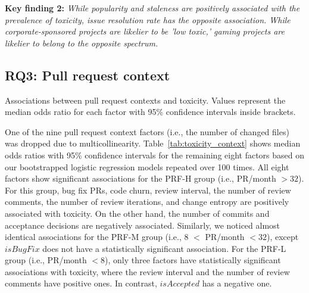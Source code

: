 \begin{boxedtext}
\textbf{Key finding  2:} \emph{ While popularity and staleness are positively associated with the prevalence of toxicity, issue resolution rate has the opposite association.
While corporate-sponsored projects are likelier to be 'low toxic,' gaming projects are likelier to belong to the opposite spectrum. 
}
\end{boxedtext}





\subsection{RQ3: Pull request context}
\label{sec:rq3}
\begin{table}
    \caption{{Associations between pull request contexts and toxicity. Values represent the median odds ratio for each factor with 95\% confidence intervals inside brackets.}}
    \label{tab:toxicity_context}
    \centering
   
    
\end{table}

One of the nine pull request context factors (i.e., the number of changed files) was dropped due to multicollinearity. Table~\ref{tab:toxicity_context} shows median odds ratios with 95\% confidence intervals for the remaining eight factors based on our bootstrapped logistic regression models repeated over 100 times. All eight factors show significant associations for the PRF-H group (i.e., PR/month $ >32$). For this group, bug fix PRs, code churn, review interval, the number of review comments, the number of review iterations, and change entropy are positively associated with toxicity. On the other hand, the number of commits and acceptance decisions are negatively associated. Similarly, we noticed almost identical associations for the PRF-M group (i.e., 8 $<$ PR/month $ <32$), except $isBugFix$ does not have a statistically significant association. For the PRF-L group (i.e.,  PR/month $ <8$), only three factors have statistically significant associations with toxicity, where the review interval and the number of review comments have positive ones. In contrast, $isAccepted$ has a negative one. 



